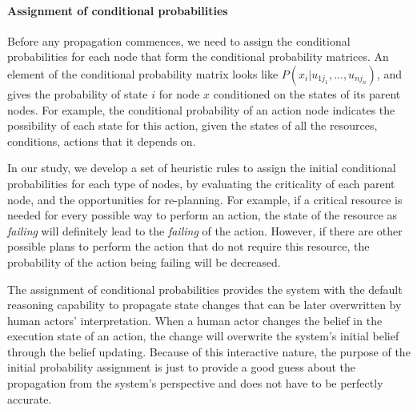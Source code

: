 \paragraph*{Assignment of conditional probabilities} %
\label{par:assignment_of_conditional_probabilities}
Before any propagation commences, we need to assign the conditional probabilities for each node that form the conditional probability matrices. An element of the conditional probability matrix looks like $P(x_i|u_{1j_1}, ..., u_{nj_n})$, and gives the probability of state $i$ for node $x$ conditioned on the states of its parent nodes. For example, the conditional probability of an action node indicates the possibility of each state for this action, given the states of all the resources, conditions, actions that it depends on. 

In our study, we develop a set of heuristic rules to assign the initial conditional probabilities for each type of nodes, by evaluating the criticality of each parent node, and the opportunities for re-planning. For example, if a critical resource is needed for every possible way to perform an action, the state of the resource as \emph{failing} will definitely lead to the \emph{failing} of the action. However, if there are other possible plans to perform the action that do not require this resource, the probability of the action being failing will be decreased.

The assignment of conditional probabilities provides the system with the default reasoning capability to propagate state changes that can be later overwritten by human actors' interpretation. When a human actor changes the belief in the execution state of an action, the change will overwrite the system’s initial belief through the belief updating. Because of this interactive nature, the purpose of the initial probability assignment is just to provide a good guess about the propagation from the system's perspective and does not have to be perfectly accurate. 

